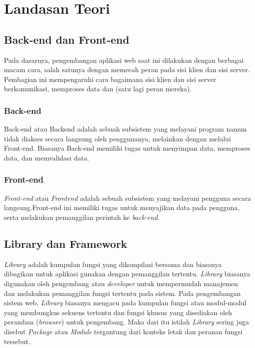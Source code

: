 \chapter{Landasan Teori}
\label{chap:teori}

\section{Back-end dan Front-end}
    Pada dasarnya, pengembangan aplikasi web saat ini dilakukan dengan
    berbagai macam cara, salah satunya dengan memecah peran pada sisi klien
    dan sisi server. Pembagian ini mempengaruhi cara bagaimana sisi klien
    dan sisi server berkomunikasi, memproses data dan (satu lagi peran
    mereka).

\subsection{Back-end}
    Back-end atau Backend adalah sebuah subsistem yang melayani program
    namun tidak diakses secara langsung oleh penggunanya, melainkan dengan
    melalui Front-end\cite{oxford:definition-backend}. Biasanya Back-end
    memiliki tugas untuk menyimpan data, memproses data, dan memvalidasi
    data.

\subsection{Front-end}
    \textit{Front-end} atau \textit{Frontend} adalah sebuah subsistem yang melayani pengguna secara langsung\cite{oxford:definition-frontend}.Front-end ini memiliki tugas untuk menyajikan data pada pengguna, serta melakukan pemanggilan perintah ke \textit{back-end}.


\section{Library dan Framework}
    \textit{Library} adalah kumpulan fungsi yang dikompilasi bersama dan biasanya dibagikan untuk aplikasi gunakan dengan pemanggilan tertentu. \textit{Library} biasanya digunakan oleh pengembang atau \emph{developer} untuk mempermudah manajemen dan melakukan pemanggilan fungsi tertentu pada sistem. Pada pengembangan sistem web, \textit{Library} biasanya mengacu pada kumpulan fungsi atau modul-modul yang membungkus sekuens tertentu dan fungsi khusus yang disediakan oleh peramban (\textit{browser}) untuk pengembang. Maka dari itu istilah \textit{Library} sering juga disebut \textit{Package} atau \textit{Module} tergantung dari konteks letak dan peranan fungsi tersebut\cite{npm-docs:packages-n-modules}\cite{node-docs:CommonJS-modules}.
    
